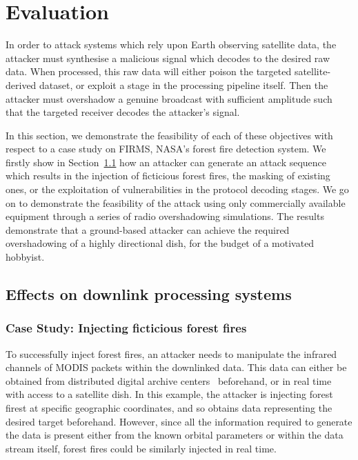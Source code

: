 \section{Evaluation}\label{sec:evaluation}

In order to attack systems which rely upon Earth observing satellite data, the attacker must synthesise a malicious signal which decodes to the desired raw data.
When processed, this raw data will either poison the targeted satellite-derived dataset, or exploit a stage in the processing pipeline itself.
Then the attacker must overshadow a genuine broadcast with sufficient amplitude such that the targeted receiver decodes the attacker's signal.

In this section, we demonstrate the feasibility of each of these objectives with respect to a case study on FIRMS, NASA's forest fire detection system.
We firstly show in Section~\ref{sec:effects-on-processing-systems} how an attacker can generate an attack sequence which results in the injection of ficticious forest fires, the masking of existing ones, or the exploitation of vulnerabilities in the protocol decoding stages.
We go on to demonstrate the feasibility of the attack using only commercially available equipment through a series of radio overshadowing simulations.
The results demonstrate that a ground-based attacker can achieve the required overshadowing of a highly directional dish, for the budget of a motivated hobbyist.

\subsection{Effects on downlink processing systems}\label{sec:effects-on-processing-systems}

\subsubsection{Case Study: Injecting ficticious forest fires}


To successfully inject forest fires, an attacker needs to manipulate the infrared channels of MODIS packets within the downlinked data.
This data can either be obtained from distributed digital archive centers~\cite{ladsweb} beforehand, or in real time with access to a satellite dish.
In this example, the attacker is injecting forest firest at specific geographic coordinates, and so obtains data representing the desired target beforehand.
However, since all the information required to generate the data is present either from the known orbital parameters or within the data stream itself, forest fires could be similarly injected in real time.

